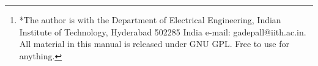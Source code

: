 \documentclass[journal,12pt,twocolumn]{IEEEtran}
\begin{document}
\author{ G V V Sharma$^{*}$ %
\thanks{*The author is with the Department
of Electrical Engineering, Indian Institute of Technology, Hyderabad
502285 India e-mail:  gadepall@iith.ac.in.  All material in this manual is released under GNU GPL. Free to use for anything.}%
}
% 
%



% 







\end{document}
